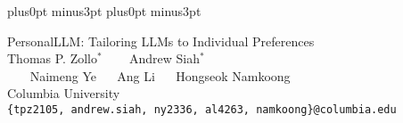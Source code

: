 \documentclass[11pt]{article}
\begin{document}
\abovedisplayskip=8pt plus0pt minus3pt
\belowdisplayskip=8pt plus0pt minus3pt



\begin{center}
  {\huge PersonalLLM: Tailoring LLMs to Individual Preferences } \\
  \vspace{.5cm} {\Large Thomas P. Zollo$^*$ ~~~ Andrew Siah$^*$}\\
  \vspace{.2cm}
  {\Large ~~~ Naimeng Ye ~~ Ang Li ~~ Hongseok Namkoong} \\
  \vspace{.2cm}
  {\large Columbia University} \\
  \vspace{.2cm}
  \texttt{\{tpz2105, andrew.siah, ny2336, al4263,  namkoong\}@columbia.edu}
\end{center}





\begin{comment}
  In-context learning (ICL) has emerged as a powerful learning paradigm. Going
  back to De Finetti’s work on Bayesian inference using observables—as opposed
  to priors on latent factors/parameters—we establish an \emph{explicit}
  equivalence between ICL and Bayesian inference \emph{a la} De Finetti. From
  this view, pre-training is precisely empirical Bayes: it optimizes the
  marginal likelihood of observed sequences; compared to fitting priors in
  conventional empirical Bayes, pre-training fits posterior predictives using
  transformers. Our observation highlights previously under-explored
  capabilities of ICL: statistical inference and uncertainty
  quantification. Our theory highlights the importance of predictive coherence
  and motivates a new regularizer for pre-training sequence models to be
  logically coherent Bayesians statisticians. Our preliminary empirical
  results demonstrate coherency regularization can substantially improve the
  inferential capabilities of ICL.
\end{comment}











\newpage



\newpage
\begin{appendix}

\end{appendix}
\end{document}
